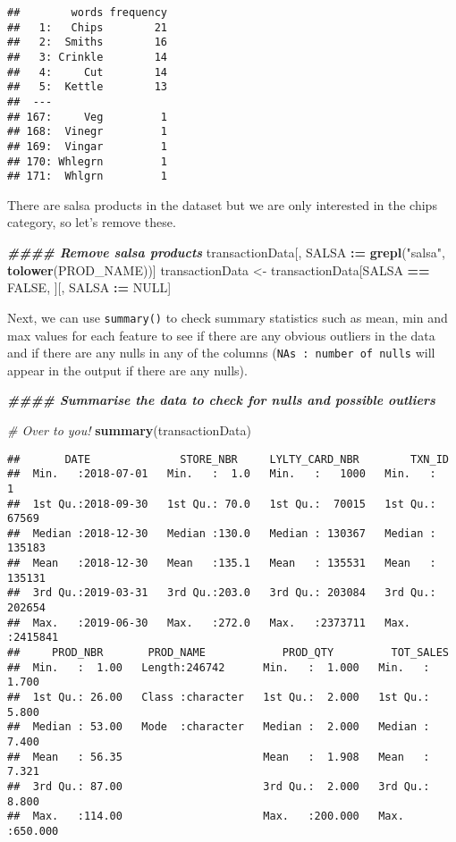 \documentclass[
]{article}
\newenvironment{Shaded}{\begin{snugshade}}{\end{snugshade}}
\newcommand{\CommentTok}[1]{\textcolor[rgb]{0.56,0.35,0.01}{\textit{#1}}}
\newcommand{\ConstantTok}[1]{\textcolor[rgb]{0.56,0.35,0.01}{#1}}
\newcommand{\DocumentationTok}[1]{\textcolor[rgb]{0.56,0.35,0.01}{\textbf{\textit{#1}}}}
\newcommand{\FunctionTok}[1]{\textcolor[rgb]{0.13,0.29,0.53}{\textbf{#1}}}
\newcommand{\NormalTok}[1]{#1}
\newcommand{\OtherTok}[1]{\textcolor[rgb]{0.56,0.35,0.01}{#1}}
\newcommand{\SpecialCharTok}[1]{\textcolor[rgb]{0.81,0.36,0.00}{\textbf{#1}}}
\newcommand{\StringTok}[1]{\textcolor[rgb]{0.31,0.60,0.02}{#1}}
\begin{document}
\begin{verbatim}
##        words frequency
##   1:   Chips        21
##   2:  Smiths        16
##   3: Crinkle        14
##   4:     Cut        14
##   5:  Kettle        13
##  ---                  
## 167:     Veg         1
## 168:  Vinegr         1
## 169:  Vingar         1
## 170: Whlegrn         1
## 171:  Whlgrn         1
\end{verbatim}

There are salsa products in the dataset but we are only interested in
the chips category, so let's remove these.

\begin{Shaded}
\begin{Highlighting}[]
\DocumentationTok{\#\#\#\# Remove salsa products}
\NormalTok{transactionData[, SALSA }\SpecialCharTok{:=} \FunctionTok{grepl}\NormalTok{(}\StringTok{"salsa"}\NormalTok{, }\FunctionTok{tolower}\NormalTok{(PROD\_NAME))]}
\NormalTok{transactionData }\OtherTok{\textless{}{-}}\NormalTok{ transactionData[SALSA }\SpecialCharTok{==} \ConstantTok{FALSE}\NormalTok{, ][, SALSA }\SpecialCharTok{:=} \ConstantTok{NULL}\NormalTok{]}
\end{Highlighting}
\end{Shaded}

Next, we can use \texttt{summary()} to check summary statistics such as
mean, min and max values for each feature to see if there are any
obvious outliers in the data and if there are any nulls in any of the
columns (\texttt{NA\textquotesingle{}s\ :\ number\ of\ nulls} will
appear in the output if there are any nulls).

\begin{Shaded}
\begin{Highlighting}[]
\DocumentationTok{\#\#\#\# Summarise the data to check for nulls and possible outliers}

\CommentTok{\# Over to you!}
\FunctionTok{summary}\NormalTok{(transactionData)}
\end{Highlighting}
\end{Shaded}

\begin{verbatim}
##       DATE              STORE_NBR     LYLTY_CARD_NBR        TXN_ID       
##  Min.   :2018-07-01   Min.   :  1.0   Min.   :   1000   Min.   :      1  
##  1st Qu.:2018-09-30   1st Qu.: 70.0   1st Qu.:  70015   1st Qu.:  67569  
##  Median :2018-12-30   Median :130.0   Median : 130367   Median : 135183  
##  Mean   :2018-12-30   Mean   :135.1   Mean   : 135531   Mean   : 135131  
##  3rd Qu.:2019-03-31   3rd Qu.:203.0   3rd Qu.: 203084   3rd Qu.: 202654  
##  Max.   :2019-06-30   Max.   :272.0   Max.   :2373711   Max.   :2415841  
##     PROD_NBR       PROD_NAME            PROD_QTY         TOT_SALES      
##  Min.   :  1.00   Length:246742      Min.   :  1.000   Min.   :  1.700  
##  1st Qu.: 26.00   Class :character   1st Qu.:  2.000   1st Qu.:  5.800  
##  Median : 53.00   Mode  :character   Median :  2.000   Median :  7.400  
##  Mean   : 56.35                      Mean   :  1.908   Mean   :  7.321  
##  3rd Qu.: 87.00                      3rd Qu.:  2.000   3rd Qu.:  8.800  
##  Max.   :114.00                      Max.   :200.000   Max.   :650.000
\end{verbatim}
\end{document}
